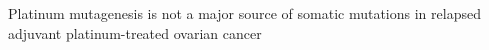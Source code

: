 Platinum mutagenesis is not a major source of somatic mutations in relapsed adjuvant platinum-treated ovarian cancer